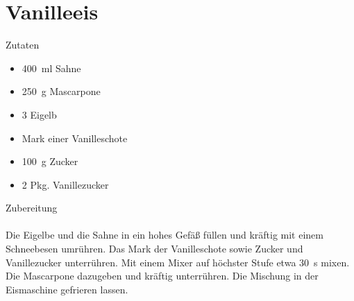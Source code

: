 \section*{Vanilleeis}
\ihead{}\ohead{}
\cfoot{}
{\Large Zutaten}
\begin{multicols}{2}
\begin{itemize}
    \item \SI{400}{ml} Sahne
    \item \SI{250}{g} Mascarpone
    \item \num{3} Eigelb
    \item Mark einer Vanilleschote
    \item \SI{100}{g} Zucker
    \item \num{2} Pkg. Vanillezucker
\end{itemize}
\end{multicols}
\noindent
{\Large Zubereitung}\\
\\
Die Eigelbe und die Sahne in ein hohes Gefäß füllen und kräftig mit einem Schneebesen umrühren. 
Das Mark der Vanilleschote sowie Zucker und Vanillezucker unterrühren.
Mit einem Mixer auf höchster Stufe etwa \SI{30}{s} mixen. 
Die Mascarpone dazugeben und kräftig unterrühren. 
Die Mischung in der Eismaschine gefrieren lassen.
